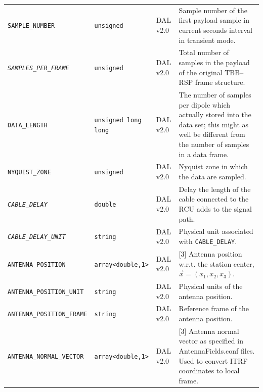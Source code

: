 \documentclass[a4paper,10pt,bibtotoc]{scrartcl}
\begin{document}
\begin{center}
\begin{supertabular}{|lllp{4.25cm}|}
    \small {\texttt{SAMPLE\_NUMBER}} & \verb|unsigned| & DAL v2.0 & Sample number of the first payload sample in current seconds interval in transient mode. \\
    \small \textit{\texttt{SAMPLES\_PER\_FRAME}} & \verb|unsigned| & DAL v2.0 & Total number of samples in the payload of the original TBB--RSP frame structure. \\
    \small {\texttt{DATA\_LENGTH}} & \verb|unsigned long long| & DAL v2.0 & The number of samples per dipole which actually stored into the data set; this might as well be different from the number of samples in a data frame. \\
    \small {\texttt{NYQUIST\_ZONE}} & \verb|unsigned| & DAL v2.0 & Nyquist zone in which the data are sampled. \\
    \small \textit{\texttt{CABLE\_DELAY}} & \verb|double| & DAL v2.0 & Delay the length of the cable connected to the RCU adds to the signal path. \\
    \small \textit{\texttt{CABLE\_DELAY\_UNIT}} & \verb|string| & DAL v2.0 & Physical unit associated with \verb|CABLE_DELAY|. \\
    \small {\texttt{ANTENNA\_POSITION}} & \verb|array<double,1>| & DAL v2.0 & [3] Antenna position w.r.t. the station center, $\vec x = (x_1,x_2,x_3)$. \\
    \small {\texttt{ANTENNA\_POSITION\_UNIT}} & \verb|string| & DAL v2.0 & Physical units of the antenna position. \\
    \small {\texttt{ANTENNA\_POSITION\_FRAME}} & \verb|string| & DAL v2.0 & Reference frame of the antenna position. \\
    \small {\texttt{ANTENNA\_NORMAL\_VECTOR}} & \verb|array<double,1>| & DAL v2.0 & [3] Antenna normal vector as specified in AntennaFields.conf files. Used to convert ITRF coordinates to local frame.\\

\end{supertabular}
\end{center}
\end{document}
